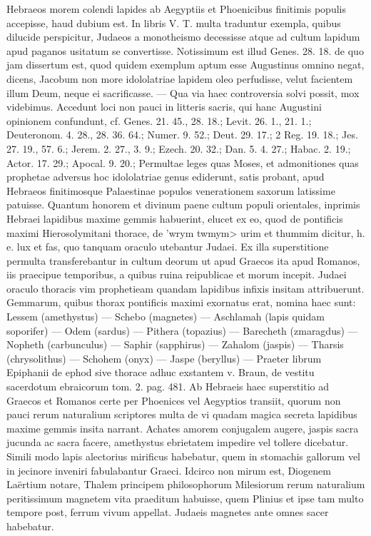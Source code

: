 \documentclass[a4paper, 11pt, oneside, polutonikogreek, german]{article}
\begin{document}
Hebraeos morem colendi lapides ab Aegyptiis et Phoenicibus finitimis populis accepisse, haud dubium est. In libris V. T. multa traduntur exempla, quibus dilucide perspicitur, Judaeos a monotheismo decessisse atque ad cultum lapidum apud paganos usitatum se convertisse. Notissimum est illud Genes. 28. 18. de quo jam dissertum est, quod quidem exemplum aptum esse Augustinus omnino negat, dicens, Jacobum non more idololatriae lapidem oleo perfudisse, velut facientem illum Deum, neque ei sacrificasse. --- Qua via haec controversia solvi possit, mox videbimus. Accedunt loci non pauci in litteris sacris, qui hanc Augustini opinionem confundunt, cf. Genes. 21. 45., 28. 18.; Levit. 26. 1., 21. 1.; Deuteronom. 4. 28., 28. 36. 64.; Numer. 9. 52.; Deut. 29. 17.; 2 Reg. 19. 18.; Jes. 27. 19., 57. 6.; Jerem. 2. 27., 3. 9.; Ezech. 20. 32.; Dan. 5. 4. 27.; Habac. 2. 19.; Actor. 17. 29.; Apocal. 9. 20.; Permultae leges quas Moses, et admonitiones quas prophetae adversus hoc idololatriae genus ediderunt, satis probant, apud Hebraeos finitimosque Palaestinae populos venerationem saxorum latissime patuisse. Quantum honorem et divinum paene cultum populi orientales, inprimis Hebraei lapidibus maxime gemmis habuerint, elucet ex eo, quod de pontificis maximi Hierosolymitani thorace, de \<'wrym twmym> urim et thummim dicitur, h. e. lux et fas, quo tanquam oraculo utebantur Judaei. Ex illa superstitione permulta transferebantur in cultum deorum ut apud Graecos ita apud Romanos, iis praecipue temporibus, a quibus ruina reipublicae et morum incepit. Judaei oraculo thoracis vim prophetieam quandam lapidibus infixis insitam attribuerunt. Gemmarum, quibus thorax pontificis maximi exornatus erat, nomina haec sunt: Lessem (amethystus) --- Schebo (magnetes) --- Aschlamah (lapis quidam soporifer) --- Odem (sardus) --- Pithera (topazius) --- Barecheth (zmaragdus) --- Nopheth (carbunculus) --- Saphir (sapphirus) --- Zahalom (jaspis) --- Tharsis (chrysolithus) --- Schohem (onyx) --- Jaspe (beryllus) --- Praeter librum Epiphanii de ephod sive thorace adhuc exstantem v. Braun, de vestitu sacerdotum ebraicorum tom. 2. pag. 481. Ab Hebraeis haec superstitio ad Graecos et Romanos certe per Phoenices vel Aegyptios transiit, quorum non pauci rerum naturalium scriptores multa de vi quadam magica secreta lapidibus maxime gemmis insita narrant. Achates amorem conjugalem augere, jaspis sacra jucunda ac sacra facere, amethystus ebrietatem impedire vel tollere dicebatur. Simili modo lapis alectorius mirificus habebatur, quem in stomachis gallorum vel in jecinore inveniri fabulabantur Graeci. Idcirco non mirum est, Diogenem Laërtium notare, Thalem principem philosophorum Milesiorum rerum naturalium peritissimum magnetem vita praeditum habuisse, quem Plinius et ipse tam multo tempore post, ferrum vivum appellat. Judaeis magnetes ante omnes sacer habebatur.
\end{document}
